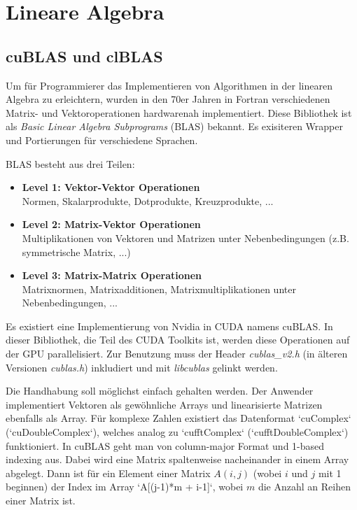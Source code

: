 	\section{Lineare Algebra}
		\subsection{cuBLAS und clBLAS}
		Um für Programmierer das Implementieren von Algorithmen in der linearen Algebra zu erleichtern, wurden in den 70er Jahren in Fortran verschiedenen Matrix- und Vektoroperationen hardwarenah implementiert. Diese Bibliothek ist als \textit{Basic Linear Algebra Subprograms} (BLAS) bekannt. Es exisiteren Wrapper und Portierungen für verschiedene Sprachen.
	
		BLAS besteht aus drei Teilen:
		\begin{itemize}
			\item \textbf{Level 1: Vektor-Vektor Operationen}\\
			Normen, Skalarprodukte, Dotprodukte, Kreuzprodukte, ...
			\item \textbf{Level 2: Matrix-Vektor Operationen}\\ Multiplikationen von Vektoren und Matrizen unter Nebenbedingungen (z.B. symmetrische Matrix, ...)
			\item \textbf{Level 3: Matrix-Matrix Operationen}\\Matrixnormen, Matrixadditionen, Matrixmultiplikationen unter Nebenbedingungen, ...
		\end{itemize}
		
		Es existiert eine Implementierung von Nvidia in CUDA namens cuBLAS. In dieser Bibliothek, die Teil des CUDA Toolkits ist, werden diese Operationen auf der GPU parallelisiert. Zur Benutzung muss der Header \textit{cublas{\_}v2.h} (in älteren Versionen \textit{cublas.h}) inkludiert und mit \textit{libcublas} gelinkt werden.
		
		Die Handhabung soll möglichst einfach gehalten werden. Der Anwender implementiert Vektoren als gewöhnliche Arrays und linearisierte Matrizen ebenfalls als Array. Für komplexe Zahlen existiert das Datenformat \li`cuComplex` (\li`cuDoubleComplex`), welches analog zu \li`cufftComplex` (\li`cufftDoubleComplex`) funktioniert. In cuBLAS geht man von column-major Format und 1-based indexing aus. Dabei wird eine Matrix spaltenweise nacheinander in einem Array abgelegt. Dann ist für ein Element einer Matrix $A(i,j)$ (wobei $i$ und $j$ mit 1 beginnen) der Index im Array \li`A[(j-1)*m + i-1]`, wobei $m$ die Anzahl an Reihen einer Matrix ist. 
		
